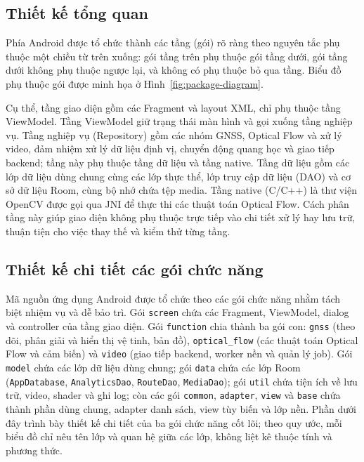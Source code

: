 \documentclass[../DoAn.tex]{subfiles}
\begin{document}
\subsection{Thiết kế tổng quan}
\label{subsection:4.1.2}
Phía Android được tổ chức thành các tầng (gói) rõ ràng theo nguyên tắc phụ thuộc một chiều từ trên xuống: gói tầng trên phụ thuộc gói tầng dưới, gói tầng dưới không phụ thuộc ngược lại, và không có phụ thuộc bỏ qua tầng. Biểu đồ phụ thuộc gói được minh họa ở Hình~\ref{fig:package-diagram}.

Cụ thể, tầng giao diện gồm các Fragment và layout XML, chỉ phụ thuộc tầng ViewModel. Tầng ViewModel giữ trạng thái màn hình và gọi xuống tầng nghiệp vụ. Tầng nghiệp vụ (Repository) gồm các nhóm GNSS, Optical Flow và xử lý video, đảm nhiệm xử lý dữ liệu định vị, chuyển động quang học và giao tiếp backend; tầng này phụ thuộc tầng dữ liệu và tầng native. Tầng dữ liệu gồm các lớp dữ liệu dùng chung cùng các lớp thực thể, lớp truy cập dữ liệu (DAO) và cơ sở dữ liệu Room, cùng bộ nhớ chứa tệp media. Tầng native (C/C++) là thư viện OpenCV được gọi qua JNI để thực thi các thuật toán Optical Flow. Cách phân tầng này giúp giao diện không phụ thuộc trực tiếp vào chi tiết xử lý hay lưu trữ, thuận tiện cho việc thay thế và kiểm thử từng tầng.


\subsection{Thiết kế chi tiết các gói chức năng}
\label{subsection:4.1.3}
Mã nguồn ứng dụng Android được tổ chức theo các gói chức năng nhằm tách biệt nhiệm vụ và dễ bảo trì. Gói \texttt{screen} chứa các Fragment, ViewModel, dialog và controller của tầng giao diện. Gói \texttt{function} chia thành ba gói con: \texttt{gnss} (theo dõi, phân giải và hiển thị vệ tinh, bản đồ), \texttt{optical\_flow} (các thuật toán Optical Flow và cảm biến) và \texttt{video} (giao tiếp backend, worker nền và quản lý job). Gói \texttt{model} chứa các lớp dữ liệu dùng chung; gói \texttt{data} chứa các lớp Room (\texttt{AppDatabase}, \texttt{AnalyticsDao}, \texttt{RouteDao}, \texttt{MediaDao}); gói \texttt{util} chứa tiện ích về lưu trữ, video, shader và ghi log; còn các gói \texttt{common}, \texttt{adapter}, \texttt{view} và \texttt{base} chứa thành phần dùng chung, adapter danh sách, view tùy biến và lớp nền. Phần dưới đây trình bày thiết kế chi tiết của ba gói chức năng cốt lõi; theo quy ước, mỗi biểu đồ chỉ nêu tên lớp và quan hệ giữa các lớp, không liệt kê thuộc tính và phương thức.
\end{document}
